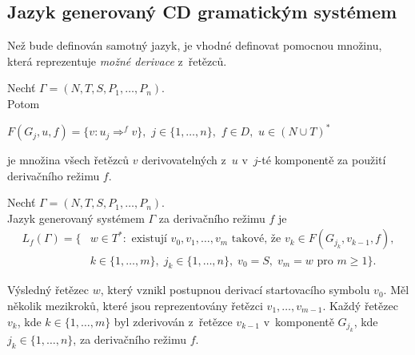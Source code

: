 \subsection*{Jazyk generovaný CD gramatickým systémem}
Než bude definován samotný jazyk, je vhodné definovat pomocnou množinu, která reprezentuje \emph{možné derivace} z~řetězců.
\begin{definition}\label{def_mozne_derivace}
    Nechť $\Gamma = (N, T, S, P_1, \ldots, P_n)$. \\  
    Potom 
    \begin{center}
        $F(G_j,u,f)=\{v:u_j\Rightarrow^{f}v\},$ $j \in \{1, \ldots, n\},$ $f\in D,$ $u\in (N \cup T)^{*}$
    \end{center}        
    je množina všech řetězců $v$ derivovatelných z~$u$ v~$j$-té komponentě za použití derivačního režimu $f$.
\end{definition}

\begin{definition}\label{def_generovany_jazyk}
    Nechť $\Gamma = (N, T, S, P_1, \ldots, P_n)$. \\  
    Jazyk generovaný systémem $\Gamma$ za derivačního režimu $f$ je 
    \begin{align*}
         L_f(\Gamma) = \{&w \in T^*: \text{ existují } v_0, v_1,\ldots, v_m \text{ takové, že } v_k \in F(G_{j_{k}},v_{k-1}, f),\\
         &k \in \{1, \ldots, m\},\;j_k \in \{1, \ldots, n\},\;v_0 = S,\;v_m = w \text{ pro } m \geq 1\}.
    \end{align*}        
\end{definition} 

Výsledný řetězec $w$, který vznikl postupnou derivací startovacího symbolu $v_0$.
Měl několik mezikroků, které jsou reprezentovány řetězci $v_1, \ldots, v_{m-1}$.
Každý řetězec $v_k$, kde $k \in \{1, \ldots, m\}$ byl zderivován z~řetězce $v_{k-1}$ v~komponentě $G_{j_{k}}$, kde $j_k \in \{1, \ldots, n\}$, za derivačního režimu $f$.

